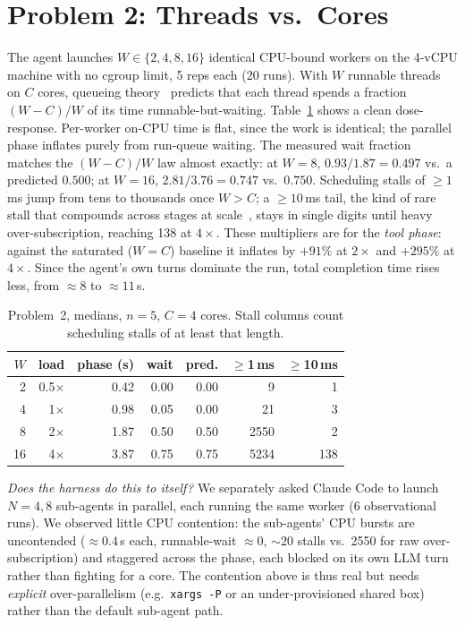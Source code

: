 \documentclass[10pt,conference]{IEEEtran}
\newcommand{\uu}[1]{\,\textsf{#1}}
\begin{document}
\section{Problem 2: Threads vs.\ Cores}
\label{sec:threads}

The agent launches $W \in \{2,4,8,16\}$ identical CPU-bound workers on the
4-vCPU machine with no cgroup limit, 5 reps each (20 runs). With $W$
runnable threads on $C$ cores, queueing theory~\cite{harchol2013} predicts
that each thread spends a fraction $(W-C)/W$ of its time
runnable-but-waiting.
Table~\ref{tab:threads} shows a clean dose-response. Per-worker on-CPU time
is flat, since the work is identical; the parallel phase inflates purely
from run-queue waiting. The measured wait fraction matches the $(W{-}C)/W$
law almost exactly: at $W{=}8$, $0.93/1.87=0.497$ vs.\ a predicted $0.500$;
at $W{=}16$, $2.81/3.76=0.747$ vs.\ $0.750$. Scheduling stalls of
$\ge 1$\uu{ms} jump from tens to thousands once $W>C$; a $\ge 10$\uu{ms}
tail, the kind of rare stall that compounds across stages at
scale~\cite{dean2013}, stays in single digits until heavy
over-subscription, reaching 138 at $4\times$. These multipliers are for the \emph{tool phase}: against the
saturated ($W{=}C$) baseline it inflates by $+91\%$ at $2\times$ and
$+295\%$ at $4\times$. Since the agent's own turns dominate the run, total
completion time rises less, from ${\approx}8$ to ${\approx}11$\uu{s}.

\begin{table}[t]\centering\footnotesize
\setlength{\tabcolsep}{4pt}
\caption{Problem~2, medians, $n{=}5$, $C{=}4$ cores. Stall columns count
scheduling stalls of at least that length.}
\label{tab:threads}
\begin{tabular}{@{}rrrrrrr@{}}
\toprule
$W$ & load & phase (s) & wait & pred. & $\ge$1\,ms & $\ge$10\,ms\\
\midrule
2  & 0.5$\times$ & 0.42 & 0.00 & 0.00 & 9    & 1 \\
4  & 1$\times$   & 0.98 & 0.05 & 0.00 & 21   & 3 \\
8  & 2$\times$   & 1.87 & 0.50 & 0.50 & 2550 & 2 \\
16 & 4$\times$   & 3.87 & 0.75 & 0.75 & 5234 & 138 \\
\bottomrule
\end{tabular}
\end{table}

\emph{Does the harness do this to itself?} We separately asked Claude Code
to launch $N{=}4,8$ sub-agents in parallel, each running the same worker (6
observational runs). We observed little CPU contention: the sub-agents' CPU
bursts are uncontended ($\approx\!0.4$\uu{s} each, runnable-wait
${\approx}0$, ${\sim}20$ stalls vs.\ 2550 for raw over-subscription) and
staggered across the phase, each blocked on its own LLM turn rather than
fighting for a core. The contention above is thus real but needs
\emph{explicit} over-parallelism (e.g.\ \texttt{xargs -P} or an
under-provisioned shared box) rather than the default sub-agent path.
\end{document}
